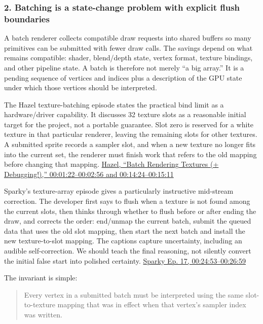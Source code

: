\subsubsection{2. Batching is a state-change problem with explicit flush boundaries}\label{batching-is-a-state-change-problem-with-explicit-flush-boundaries}

A batch renderer collects compatible draw requests into shared buffers so many primitives can be submitted with fewer draw calls. The savings depend on what remains compatible: shader, blend/depth state, vertex format, texture bindings, and other pipeline state. A batch is therefore not merely ``a big array.'' It is a pending sequence of vertices and indices plus a description of the GPU state under which those vertices should be interpreted.

The Hazel texture-batching episode states the practical bind limit as a hardware/driver capability. It discusses 32 texture slots as a reasonable initial target for the project, not a portable guarantee. Slot zero is reserved for a white texture in that particular renderer, leaving the remaining slots for other textures. A submitted sprite records a sampler slot, and when a new texture no longer fits into the current set, the renderer must finish work that refers to the old mapping before changing that mapping. \href{https://www.youtube.com/watch?v=Fz1VySWaad8&t=1m22s}{Hazel, ``Batch Rendering Textures (+ Debugging!),'' 00:01:22--00:02:56 and 00:14:24--00:15:11}

Sparky's texture-array episode gives a particularly instructive mid-stream correction. The developer first says to flush when a texture is not found among the current slots, then thinks through whether to flush before or after ending the draw, and corrects the order: end/unmap the current batch, submit the queued data that uses the old slot mapping, then start the next batch and install the new texture-to-slot mapping. The captions capture uncertainty, including an audible self-correction. We should teach the final reasoning, not silently convert the initial false start into polished certainty. \href{https://www.youtube.com/watch?v=1x4hrdS97cI&t=24m53s}{Sparky Ep. 17, 00:24:53--00:26:59}

The invariant is simple:

\begin{quote}
Every vertex in a submitted batch must be interpreted using the same slot-to-texture mapping that was in effect when that vertex's sampler index was written.
\end{quote}

